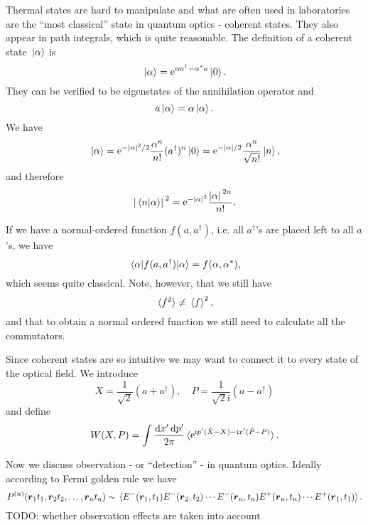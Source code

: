 \documentclass[hyperref, a4paper]{article}
\newcommand*{\ii}{\mathrm{i}}
\newcommand*{\ee}{\mathrm{e}}
\begin{document}
Thermal states are hard to manipulate and what are often used in laboratories are the ``most classical'' state in quantum optics - coherent states.
They also appear in path integrals, which is quite reasonable.
The definition of a coherent state $\ket*{\alpha}$ is 
\begin{equation}
    \ket*{\alpha} = \ee^{\alpha a^\dagger - \alpha^* a} \ket*{0} .
\end{equation}
They can be verified to be eigenstates of the annihilation operator and 
\begin{equation}
    a \ket*{\alpha} = \alpha \ket*{\alpha}.
\end{equation}
We have 
\begin{equation}
    \ket*{\alpha} = \ee^{- \abs*{\alpha}^2 / 2} \frac{\alpha^n}{n!} (a^\dagger)^n \ket*{0} 
    = \ee^{- \abs*{\alpha} / 2} \frac{\alpha^n}{\sqrt{n!}} \ket*{n},
\end{equation}
and therefore 
\begin{equation}
    \abs*{\braket*{n}{\alpha}}^2 = \ee^{- \abs*{\alpha}^2} \frac{\abs*{\alpha}^{2n}}{n!}.
\end{equation}

If we have a normal-ordered function $f(a, a^\dagger)$, i.e. all $a^\dagger$'s are placed left to all $a$'s, 
we have 
\begin{equation}
    \expval*{f(a, a^\dagger)}{\alpha} = f(\alpha, \alpha^*),
\end{equation}
which seems quite classical. Note, however, that we still have 
\[
    \expval*{f^2} \neq \expval*{f}^2,
\]
and that to obtain a normal ordered function we still need to calculate all the commutators.

Since coherent states are so intuitive we may want to connect it to every state of the optical field.
We introduce 
\begin{equation}
    X = \frac{1}{\sqrt{2}} (a + a^\dagger), \quad P = \frac{1}{\sqrt{2} \ii} (a - a^\dagger)
\end{equation}
and define 
\begin{equation}
    W(X, P) = \int \frac{\dd{x'} \dd{p'}}{2\pi} \expval*{\ee^{\ii p' (\hat{X} - X) - \ii x'(\hat{P} - P)}}. 
\end{equation}

Now we discuss observation - or ``detection'' - in quantum optics. Ideally according to Fermi golden rule we have 
\[
    P^{(n)}(\vb*{r}_1 t_1, \vb*{r}_2 t_2, \ldots, \vb*{r}_n t_n) 
    \sim \expval*{E^-(\vb*{r}_1, t_1) E^-(\vb*{r}_2, t_2) \cdots E^-(\vb*{r}_n, t_n) E^+(\vb*{r}_n, t_n) \cdots E^+(\vb*{r}_1, t_1)}.
\]
TODO: whether observation effects are taken into account 
\end{document}
